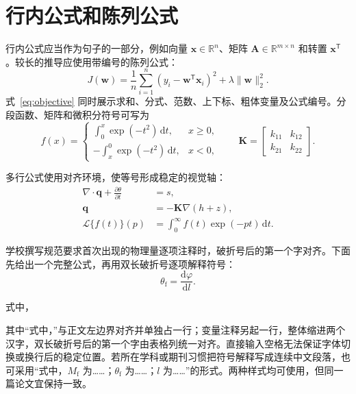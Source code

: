 \section{行内公式和陈列公式}
行内公式应当作为句子的一部分，例如向量 $\boldsymbol{x}\in\mathbb{R}^{n}$、矩阵 $\boldsymbol{A}\in\mathbb{R}^{m\times n}$ 和转置 $\boldsymbol{x}^{\mathsf T}$。较长的推导应使用带编号的陈列公式：
\begin{equation}
  J(\boldsymbol{w})=\frac{1}{n}\sum_{i=1}^{n}\left(y_i-\boldsymbol{w}^{\mathsf T}\boldsymbol{x}_i\right)^2+\lambda\lVert\boldsymbol{w}\rVert_2^2.
  \label{eq:objective}
\end{equation}
式~\eqref{eq:objective} 同时展示求和、分式、范数、上下标、粗体变量及公式编号。分段函数、矩阵和微积分符号可写为
\begin{equation}
  f(x)=
  \begin{cases}
    \displaystyle \int_{0}^{x}\exp(-t^2)\,\mathrm{d}t, & x\geq 0,\\[4pt]
    \displaystyle -\int_{x}^{0}\exp(-t^2)\,\mathrm{d}t, & x<0,
  \end{cases}
  \qquad
  \boldsymbol{K}=\begin{bmatrix}k_{11}&k_{12}\\k_{21}&k_{22}\end{bmatrix}.
\end{equation}

多行公式使用对齐环境，使等号形成稳定的视觉轴：
\begin{align}
  \nabla\cdot\boldsymbol{q}+\frac{\partial \theta}{\partial t}&=s,\\
  \boldsymbol{q}&=-\boldsymbol{K}\nabla(h+z),\\
  \mathcal{L}\{f(t)\}(p)&=\int_{0}^{\infty} f(t)\exp(-pt)\,\mathrm{d}t.
\end{align}

学校撰写规范要求首次出现的物理量逐项注释时，破折号后的第一个字对齐。下面先给出一个完整公式，再用双长破折号逐项解释符号：
\begin{equation}
  \theta_{\mathrm f}=\frac{\mathrm d\varphi}{\mathrm d l}.
  \label{eq:torsion-angle}
\end{equation}
\par\noindent 式中，\par\nobreak
\begin{bjutformulaexplanation}
\end{bjutformulaexplanation}
其中“式中，”与正文左边界对齐并单独占一行；变量注释另起一行，整体缩进两个汉字，双长破折号后的第一个字由表格列统一对齐。直接输入空格无法保证字体切换或换行后的稳定位置。若所在学科或期刊习惯把符号解释写成连续中文段落，也可采用“式中，$M_{\mathrm f}$ 为……；$\theta_{\mathrm f}$ 为……；$l$ 为……”的形式。两种样式均可使用，但同一篇论文宜保持一致。

